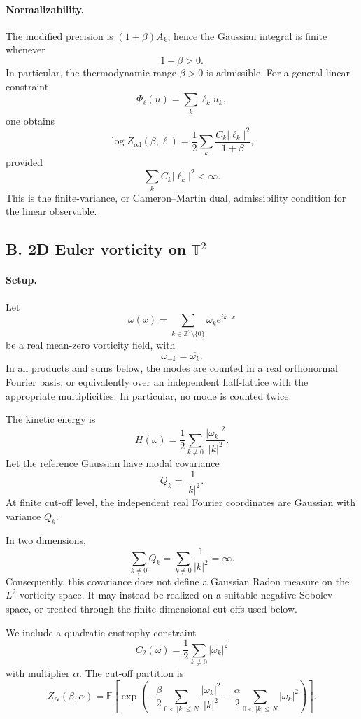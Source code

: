 \documentclass[11pt,reqno]{amsart}
\begin{document}
\paragraph{Normalizability.}
The modified precision is $(1+\beta)A_k$, hence the Gaussian integral
is finite whenever
\[
1+\beta>0.
\]
In particular, the thermodynamic range $\beta>0$ is admissible. For a
general linear constraint
\[
\Phi_\ell(u)=\sum_k\ell_k u_k,
\]
one obtains
\[
\log Z_{\mathrm{rel}}(\beta,\ell)
=
\frac12
\sum_k
\frac{C_k|\ell_k|^2}{1+\beta},
\]
provided
\[
\sum_k C_k|\ell_k|^2<\infty.
\]
This is the finite-variance, or Cameron--Martin dual, admissibility
condition for the linear observable.

\subsection*{B. 2D Euler vorticity on \(\mathbb T^2\)}

\paragraph{Setup.}
Let
\[
\omega(x)
=
\sum_{k\in\mathbb Z^2\setminus\{0\}}
\omega_k e^{ik\cdot x}
\]
be a real mean-zero vorticity field, with
\[
\omega_{-k}=\overline{\omega_k}.
\]
In all products and sums below, the modes are counted in a real
orthonormal Fourier basis, or equivalently over an independent
half-lattice with the appropriate multiplicities. In particular, no
mode is counted twice.

The kinetic energy is
\[
H(\omega)
=
\frac12
\sum_{k\neq 0}
\frac{|\omega_k|^2}{|k|^2}.
\]
Let the reference Gaussian have modal covariance
\[
Q_k=\frac{1}{|k|^2}.
\]
At finite cut-off level, the independent real Fourier coordinates are
Gaussian with variance $Q_k$.

In two dimensions,
\[
\sum_{k\neq 0}Q_k
=
\sum_{k\neq 0}\frac{1}{|k|^2}
=
\infty.
\]
Consequently, this covariance does not define a Gaussian Radon measure
on the $L^2$ vorticity space. It may instead be realized on a suitable
negative Sobolev space, or treated through the finite-dimensional
cut-offs used below.

We include a quadratic enstrophy constraint
\[
C_2(\omega)
=
\frac12\sum_{k\neq 0}|\omega_k|^2
\]
with multiplier $\alpha$. The cut-off partition is
\[
Z_N(\beta,\alpha)
=
\mathbb E
\left[
\exp\left(
-\frac{\beta}{2}
\sum_{0<|k|\leq N}
\frac{|\omega_k|^2}{|k|^2}
-
\frac{\alpha}{2}
\sum_{0<|k|\leq N}
|\omega_k|^2
\right)
\right].
\]
\end{document}
